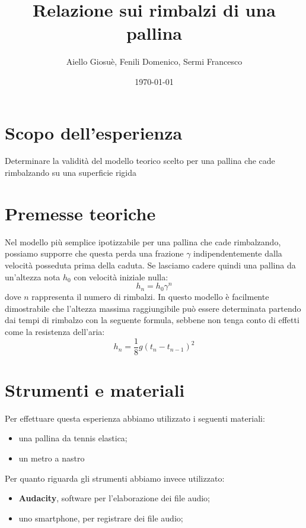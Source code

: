 \documentclass{article}
\title{Relazione sui rimbalzi di una pallina}
\author{Aiello Giosuè, Fenili Domenico, Sermi Francesco}
\date{\today}
\begin{document}
\maketitle
\pagebreak
\tableofcontents
\pagebreak
\section{Scopo dell'esperienza}
Determinare la validità del modello teorico scelto per una pallina che cade rimbalzando su una superficie rigida
\section{Premesse teoriche}
Nel modello più semplice ipotizzabile per una pallina che cade rimbalzando, possiamo supporre che questa perda una frazione $\gamma$ indipendentemente dalla velocità posseduta prima della caduta. Se lasciamo cadere quindi una pallina da un'altezza nota $h_0$ con velocità iniziale nulla:
\begin{equation}
	h_n = h_0 \gamma ^n
\end{equation}
dove $n$ rappresenta il numero di rimbalzi. In questo modello è facilmente dimostrabile che l'altezza massima raggiungibile può essere determinata partendo dai tempi di rimbalzo con la seguente formula, sebbene non tenga conto di effetti come la resistenza dell'aria:
\begin{equation}
	h_n = \frac{1}{8} g (t_n - t_{n-1})^2
\end{equation}
\section{Strumenti e materiali}
Per effettuare questa esperienza abbiamo utilizzato i seguenti materiali:
\begin{itemize}
	\item una pallina da tennis elastica;
	\item un metro a nastro
\end{itemize}
Per quanto riguarda gli strumenti abbiamo invece utilizzato:
\begin{itemize}
	\item \textbf{Audacity}, software per l'elaborazione dei file audio;
	\item uno smartphone, per registrare dei file audio;
\end{itemize}
\end{document}
